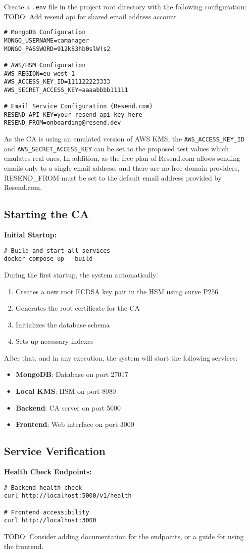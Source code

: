 Create a \texttt{.env} file in the project root directory with the following configuration:
{\color{red}TODO: Add resend api for shared email address account}
\begin{verbatim}
# MongoDB Configuration
MONGO_USERNAME=camanager
MONGO_PASSWORD=912k83hb0slW)s2

# AWS/HSM Configuration
AWS_REGION=eu-west-1
AWS_ACCESS_KEY_ID=111122223333
AWS_SECRET_ACCESS_KEY=aaaabbbb11111

# Email Service Configuration (Resend.com)
RESEND_API_KEY=your_resend_api_key_here
RESEND_FROM=onboarding@resend.dev
\end{verbatim}
As the CA is using an emulated version of AWS KMS, the 
\texttt{AWS\_ACCESS\_KEY\_ID} and \texttt{AWS\_SECRET\_ACCESS\_KEY} can be set to the proposed 
test values which emulates real ones. In addition, as the free plan of Resend.com allows sending 
emails only to a single email address, and there are no free domain providers, RESEND\_FROM must be 
set to the default email address provided by Resend.com.

\subsection{Starting the CA}

\textbf{Initial Startup:}
\begin{verbatim}
# Build and start all services
docker compose up --build
\end{verbatim}
During the first startup, the system automatically:
\begin{enumerate}
    \item Creates a new root ECDSA key pair in the HSM using curve P256
    \item Generates the root certificate for the CA
    \item Initializes the database schema
    \item Sets up necessary indexes
\end{enumerate}
After that, and in any execution, the system will start the following services:
\begin{itemize}
    \item \textbf{MongoDB}: Database on port 27017
    \item \textbf{Local KMS}: HSM on port 8080
    \item \textbf{Backend}: CA server on port 5000
    \item \textbf{Frontend}: Web interface on port 3000
\end{itemize}

\subsection{Service Verification}

\textbf{Health Check Endpoints:}
\begin{verbatim}
# Backend health check
curl http://localhost:5000/v1/health

# Frontend accessibility
curl http://localhost:3000
\end{verbatim}

{\color{red}TODO: Consider adding documentation for the endpoints, or a guide for using the frontend.}